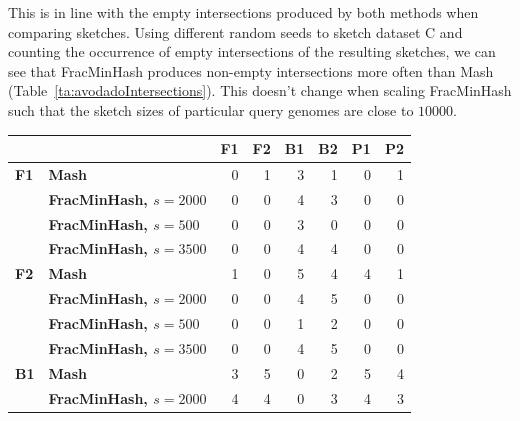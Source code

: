 This is in line with the empty intersections produced by both methods when
comparing sketches. Using different random seeds to sketch dataset C and
counting the occurrence of empty intersections of the resulting sketches, we can
see that FracMinHash produces non-empty intersections more often than Mash
(Table~\ref{ta:avodadoIntersections}). This doesn't change when scaling
FracMinHash such that the sketch sizes of particular query genomes are close to
$10000$.


\begin{table}[]
  \centering
  \begin{tabular}{@{}llrrrrrr@{}}
  \toprule
  \textbf{}   & \textbf{}                      & \textbf{F1} & \textbf{F2} & \textbf{B1} & \textbf{B2} & \textbf{P1} & \textbf{P2} \\ \midrule
  \textbf{F1} & \textbf{Mash}                  & 0           & 1           & 3           & 1           & 0           & 1           \\
  \textbf{}   & \textbf{FracMinHash, $s=2000$} & 0           & 0           & 4           & 3           & 0           & 0           \\
  \textbf{}   & \textbf{FracMinHash, $s=500$}  & 0           & 0           & 3           & 0           & 0           & 0           \\
  \textbf{}   & \textbf{FracMinHash, $s=3500$} & 0           & 0           & 4           & 4           & 0           & 0           \\ \midrule
  \textbf{F2} & \textbf{Mash}                  & 1           & 0           & 5           & 4           & 4           & 1           \\
  \textbf{}   & \textbf{FracMinHash, $s=2000$} & 0           & 0           & 4           & 5           & 0           & 0           \\
  \textbf{}   & \textbf{FracMinHash, $s=500$}  & 0           & 0           & 1           & 2           & 0           & 0           \\
  \textbf{}   & \textbf{FracMinHash, $s=3500$} & 0           & 0           & 4           & 5           & 0           & 0           \\ \midrule
  \textbf{B1} & \textbf{Mash}                  & 3           & 5           & 0           & 2           & 5           & 4           \\
              & \textbf{FracMinHash, $s=2000$} & 4           & 4           & 0           & 3           & 4           & 3           \\

\end{tabular}
\end{table}
